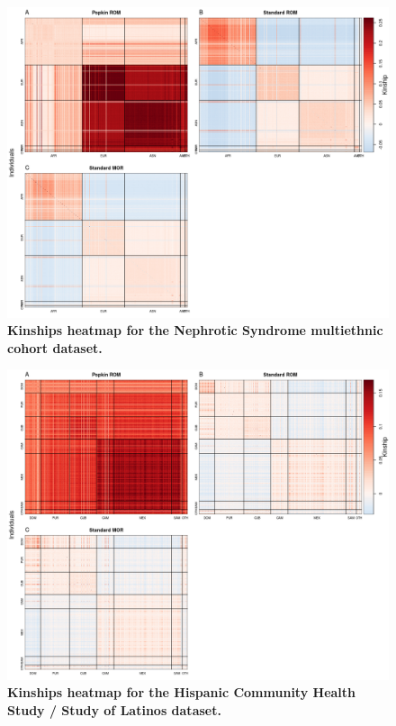 \documentclass[11pt]{article}
\begin{document}
\begin{figure}[bp!]
  \centering
  \includegraphics[width=\textwidth]{data/SFig_NS_sex_array_kinships.png}
  \caption{
    {\bf Kinships heatmap for the Nephrotic Syndrome multiethnic cohort dataset.}
    }
  \label{fig:NS_kinships}
\end{figure}

\begin{figure}[bp!]
  \centering
  \includegraphics[width=\textwidth]{data/SFig_HCHS_All_maf001_kinships.png}
  \caption{
    {\bf Kinships heatmap for the Hispanic Community Health Study / Study of Latinos dataset.}
    }
  \label{fig:HCHS_kinships}
\end{figure}
\end{document}
